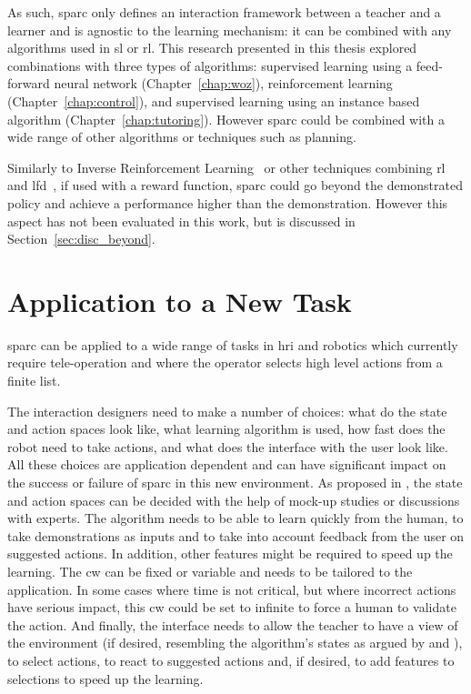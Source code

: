 As such, \gls{sparc} only defines an interaction framework between a teacher and a learner and is agnostic to the learning mechanism: it can be combined with any algorithms used in \gls{sl} or \gls{rl}. This research presented in this thesis explored combinations with three types of algorithms: supervised learning using a feed-forward neural network (Chapter~\ref{chap:woz}), reinforcement learning (Chapter~\ref{chap:control}), and supervised learning using an instance based algorithm (Chapter~\ref{chap:tutoring}). However \gls{sparc} could be combined with a wide range of other algorithms or techniques such as planning.

Similarly to Inverse Reinforcement Learning~\citep{abbeel2004apprenticeship} or other techniques combining \gls{rl} and \gls{lfd}~\citep{billard2008robot}, if used with a reward function, \gls{sparc} could go beyond the demonstrated policy and achieve a performance higher than the demonstration. However this aspect has not been evaluated in this work, but is discussed in Section~\ref{sec:disc_beyond}.

\section{Application to a New Task}

\gls{sparc} can be applied to a wide range of tasks in \gls{hri} and robotics which currently require tele-operation and where the operator selects high level actions from a finite list. 

The interaction designers need to make a number of choices: what do the state and action spaces look like, what learning algorithm is used, how fast does the robot need to take actions, and what does the interface with the user look like.  All these choices are application dependent and can have significant impact on the success or failure of \gls{sparc} in this new environment. As proposed in \cite{sequeira2016discovering}, the state and action spaces can be decided with the help of mock-up studies or discussions with experts. The algorithm needs to be able to learn quickly from the human, to take demonstrations as inputs and to take into account feedback from the user on suggested actions. In addition, other features might be required to speed up the learning. The \gls{cw} can be fixed or variable and needs to be tailored to the application. In some cases where time is not critical, but where incorrect actions have serious impact, this \gls{cw} could be set to infinite to force a human to validate the action. And finally, the interface needs to allow the teacher to have a view of the environment (if desired, resembling the algorithm's states as argued by \citealt{knox2014learning} and \citealt{sequeira2016discovering}), to select actions, to react to suggested actions and, if desired, to add features to selections to speed up the learning.

